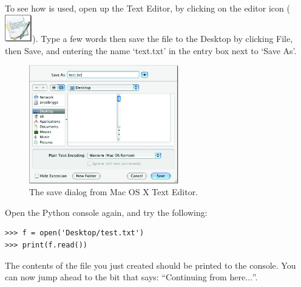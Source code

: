 \begin{MAC}
To see how  is used, open up the Text Editor, by clicking on the editor icon (\includegraphics*[width=12mm]{../en/textedit-icon.eps}).  Type a few words then save the file to the Desktop by clicking File, then Save, and entering the name `text.txt' in the entry box next to `Save As'.

\begin{figure}
\begin{center}
\includegraphics[width=65mm]{../en/figure18.eps}
\end{center}
\caption{The save dialog from Mac OS X Text Editor.}\label{fig18}
\end{figure}

Open the Python console again, and try the following:

\begin{listing}
\begin{verbatim}
>>> f = open('Desktop/test.txt')
>>> print(f.read())
\end{verbatim}
\end{listing}

The contents of the file you just created should be printed to the console.  You can now jump ahead to the bit that says: ``Continuing from here$\ldots$''.
\end{MAC}

